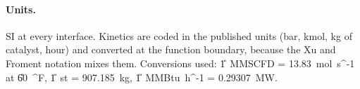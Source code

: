 \paragraph{Units.} SI at every interface. Kinetics are coded in the published units (bar, kmol, kg of catalyst, hour) and converted at the function boundary, because the Xu and Froment notation mixes them. Conversions used: \U{1\ MMSCFD = 13.83\ mol\ s^{-1}} at \U{60\ ^{\circ}F}, \U{1\ st = 907.185\ kg}, \U{1\ MMBtu\ h^{-1} = 0.29307\ MW}.
